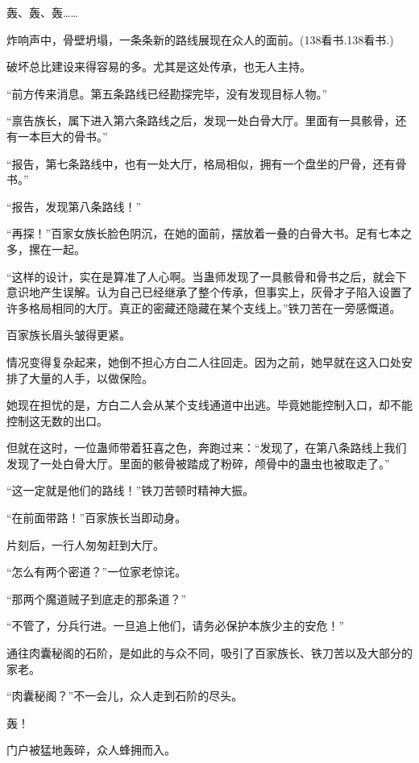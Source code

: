 
\begin{this_body}

轰、轰、轰……

炸响声中，骨壁坍塌，一条条新的路线展现在众人的面前。(138看书.138看书.)

破坏总比建设来得容易的多。尤其是这处传承，也无人主持。

“前方传来消息。第五条路线已经勘探完毕，没有发现目标人物。”

“禀告族长，属下进入第六条路线之后，发现一处白骨大厅。里面有一具骸骨，还有一本巨大的骨书。”

“报告，第七条路线中，也有一处大厅，格局相似，拥有一个盘坐的尸骨，还有骨书。”

“报告，发现第八条路线！”

“再探！”百家女族长脸色阴沉，在她的面前，摆放着一叠的白骨大书。足有七本之多，摞在一起。

“这样的设计，实在是算准了人心啊。当蛊师发现了一具骸骨和骨书之后，就会下意识地产生误解。认为自己已经继承了整个传承，但事实上，灰骨才子陷入设置了许多格局相同的大厅。真正的密藏还隐藏在某个支线上。”铁刀苦在一旁感慨道。

百家族长眉头皱得更紧。

情况变得复杂起来，她倒不担心方白二人往回走。因为之前，她早就在这入口处安排了大量的人手，以做保险。

她现在担忧的是，方白二人会从某个支线通道中出逃。毕竟她能控制入口，却不能控制这无数的出口。

但就在这时，一位蛊师带着狂喜之色，奔跑过来：“发现了，在第八条路线上我们发现了一处白骨大厅。里面的骸骨被踏成了粉碎，颅骨中的蛊虫也被取走了。”

“这一定就是他们的路线！”铁刀苦顿时精神大振。

“在前面带路！”百家族长当即动身。

片刻后，一行人匆匆赶到大厅。

“怎么有两个密道？”一位家老惊诧。

“那两个魔道贼子到底走的那条道？”

“不管了，分兵行进。一旦追上他们，请务必保护本族少主的安危！”

通往肉囊秘阁的石阶，是如此的与众不同，吸引了百家族长、铁刀苦以及大部分的家老。

“肉囊秘阁？”不一会儿，众人走到石阶的尽头。

轰！

门户被猛地轰碎，众人蜂拥而入。


\end{this_body}
